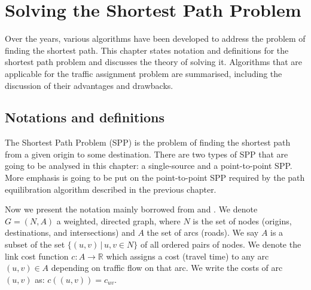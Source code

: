 \chapter{Solving the Shortest Path Problem} \label{chap:solvingspp}

Over the years,
various algorithms have been developed 
to address the problem of finding the shortest path.
This chapter states notation and definitions for the shortest path problem and discusses
the theory of solving it.
Algorithms that are applicable for the traffic assignment problem are summarised,
including the discussion of their advantages and drawbacks.

\section{Notations and definitions}
The Shortest Path Problem (SPP) is the problem of finding the shortest path from a given origin  to some destination.
There are two types of SPP that are going to
be analysed in this chapter:
a single-source and a point-to-point SPP.  
More emphasis is going to be put on the point-to-point SPP required by the path equilibration algorithm described in the previous chapter.


Now we present the notation mainly borrowed from \citet{Cormen} and \citet{Klunder}.
We denote $ G = ( N, A ) $ a weighted, directed graph,
where $ N $ is the set of nodes (origins, destinations, and intersections)
and $ A $ the set of arcs (roads).
We say $ A $ is a subset of the set $ \{ (u, v)\, | \, u, v \in N \} $ of all ordered pairs of nodes.
We denote the link cost function $ c : A \rightarrow \mathbb{R} $ which assigns a cost (travel time) to any arc $ (u,v) \in A $ depending on traffic flow on that arc.
We write the costs of arc $(u, v)$ as: $ c((u, v)) = c_{uv} $.

